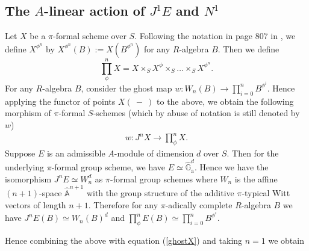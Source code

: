 \documentclass{amsart}
\numberwithin {equation}{section}
\newcommand{\map}{\rightarrow}
\newcommand{\bb}[1]{\mathbb{#1}}
\def \hG{\hat{\mathbb{G}}_{\mathrm{a}}}
\begin{document}
\subsection{The $A$-linear action of $J^{1}E$ and $N^{1}$} \cblue 
Let $X$ be a $\pi$-formal scheme over $S$. Following the notation in page $807$ in \cite{BS b}, we define $X^{\phi^{n}}$ by $X^{\phi^{n}}(B):=X(B^{\phi^{n}})$ for any $R$-algebra $B$. Then we define
$$\prod^{n}_{\phi}X=X\times_{S}X^{\phi}\times_{S}\ldots \times_{S}X^{\phi^{n}}.$$ 
For any $R$-algebra $B$, consider  the ghost map $w: W_n(B) \map 
\prod^{n}_{i=0} B^{\phi^i}$. 
Hence applying the functor of points $X(~-~)$ 
to the above,
we obtain the following morphism of $\pi$-formal $S$-schemes (which by abuse of
notation is still denoted by $w$)
\begin{align}
\label{ghostX}
w:J^{n}X\longrightarrow \prod^{n}_{\phi}X. 
\end{align}
Suppose $E$ is an admissible $A$-module of dimension $d$ over $S$. Then
for the underlying $\pi$-formal group scheme, we have $E \simeq \hG^d$.
Hence we have the isomorphism $J^nE \simeq W_n^d$ as $\pi$-formal group 
schemes where $W_n$ is the
affine $(n+1)$-space $\hat{\bb{A}}^{n+1}$ with the group structure of the 
additive $\pi$-typical Witt vectors of length $n+1$.
Therefore for any $\pi$-adically complete $R$-algebra $B$ we have $J^nE(B) 
\simeq W_n(B)^d$ and $\prod^n_{\phi} E(B) \simeq \prod^n_{i=0} B^{\phi^i}$.

Hence combining the above with equation (\ref{ghostX}) and taking $n=1$ we 
obtain


\color{black}
\end{document}

